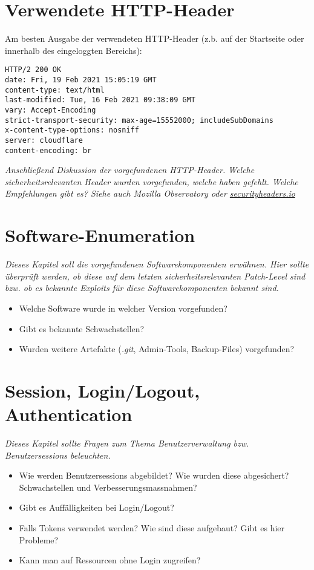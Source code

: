 \documentclass[12pt,a4paper]{report}
\begin{document}
\section{Verwendete HTTP-Header}

Am besten Ausgabe der verwendeten HTTP-Header (z.b. auf der Startseite oder innerhalb des eingeloggten Bereichs):

\begin{verbatim}
HTTP/2 200 OK
date: Fri, 19 Feb 2021 15:05:19 GMT
content-type: text/html
last-modified: Tue, 16 Feb 2021 09:38:09 GMT
vary: Accept-Encoding
strict-transport-security: max-age=15552000; includeSubDomains
x-content-type-options: nosniff
server: cloudflare
content-encoding: br
\end{verbatim}

\textit{Anschließend Diskussion der vorgefundenen HTTP-Header. Welche sicherheitsrelevanten Header wurden vorgefunden, welche haben gefehlt. Welche Empfehlungen gibt es? Siehe auch Mozilla Observatory oder \url{securityheaders.io}}

\section{Software-Enumeration}

\textit{Dieses Kapitel soll die vorgefundenen Softwarekomponenten erwähnen. Hier sollte überprüft werden, ob diese auf dem letzten sicherheitsrelevanten Patch-Level sind bzw. ob es bekannte Exploits für diese Softwarekomponenten bekannt sind.}

\begin{itemize}
	\item Welche Software wurde in welcher Version vorgefunden?
	\item Gibt es bekannte Schwachstellen?
	\item Wurden weitere Artefakte (\textit{.git}, Admin-Tools, Backup-Files) vorgefunden?
\end{itemize}

\section{Session, Login/Logout, Authentication}

\textit{Dieses Kapitel sollte Fragen zum Thema Benutzerverwaltung bzw. Benutzersessions beleuchten.}

\begin{itemize}
				\item Wie werden Benutzersessions abgebildet? Wie wurden diese abgesichert? Schwachstellen und Verbesserungsmassnahmen?
				\item Gibt es Auffälligkeiten bei Login/Logout?
				\item Falls Tokens verwendet werden? Wie sind diese aufgebaut? Gibt es hier Probleme?
				\item Kann man auf Ressourcen ohne Login zugreifen?
\end{itemize}
\end{document}
